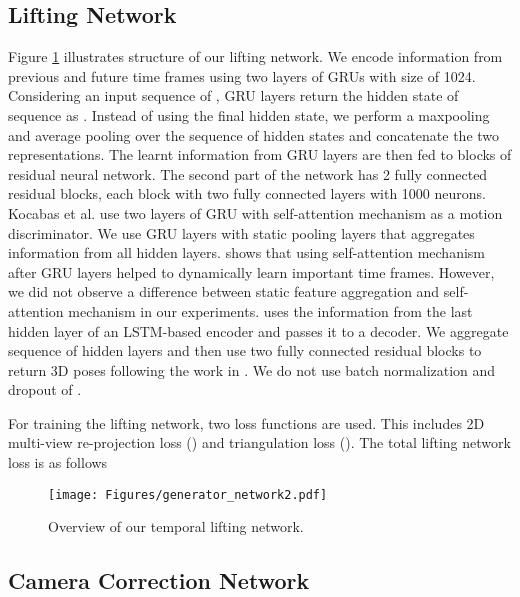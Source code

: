 \documentclass[10pt,twocolumn,letterpaper]{article}
\begin{document}
\subsection{Lifting Network}
Figure \ref{fig:liftingnet} illustrates structure of our lifting network. We encode information from previous and future time frames using two layers of GRUs with size of 1024. Considering an input sequence of , GRU layers return the hidden state of sequence as . Instead of using the final hidden state, we perform a maxpooling and average pooling over the sequence of hidden states and concatenate the two representations. The learnt information from GRU layers are then fed to blocks of residual neural network. The second part of the network has 2 fully connected residual blocks, each block with two fully connected layers with 1000 neurons. Kocabas et al. \cite{Kocabas_2020_CVPR} use two layers of GRU with self-attention mechanism as a motion discriminator. We use GRU layers with static pooling layers that aggregates information from all hidden layers. \cite{Kocabas_2020_CVPR} shows that using self-attention mechanism after GRU layers helped to dynamically learn important time frames. However, we did not observe a difference between static feature aggregation and self-attention mechanism in our experiments. \cite{Hossain_2018_ECCV} uses the information from the last hidden layer of an LSTM-based encoder and passes it to a decoder. We aggregate sequence of hidden layers and then use two fully connected residual blocks to return 3D poses following the work in \cite{Martinez_2017_ICCV}. We do not use batch normalization and dropout of \cite{Martinez_2017_ICCV}. 

For training the lifting network, two loss functions are used. This includes 2D multi-view re-projection loss () and triangulation loss (). The total lifting network loss is as follows

\begin{figure}[t]
\begin{center}
\texttt{[image: Figures/generator\_network2.pdf]}
\end{center}
  \caption{Overview of our temporal lifting network.}
\label{fig:liftingnet}
\end{figure} 

\subsection{Camera Correction Network}
\label{sec:camera net}
\end{document}
